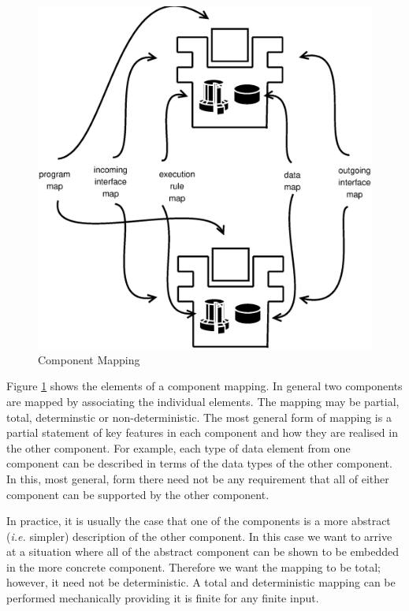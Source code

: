 \documentclass{article}
\begin{document}
\begin{figure}
\begin{center}
\includegraphics[scale=0.5]{ComponentMapping.eps}
\end{center}
\caption{Component Mapping}
\label{ComponentMapping}
\end{figure}

Figure \ref{ComponentMapping} shows the elements of a component mapping. In general two
components are mapped by associating the individual elements. The mapping may be partial,
total, determinstic or non-deterministic. The most general form of mapping is a partial
statement of key features in each component and how they are realised in the other
component. For example, each type of data element from one component can be described
in terms of the data types of the other component. In this, most general, form there need
not be any requirement that all of either component can be supported by the other component.

In practice, it is usually the case that one of the components is a more abstract ({\em i.e.}
simpler) description of the other component. In this case we want to arrive at a situation 
where all of the abstract component can be shown to be embedded in the more concrete
component. Therefore we want the mapping to be total; however, it need not be deterministic.
A total and deterministic mapping can be performed mechanically providing it is finite for
any finite input.
\end{document}
